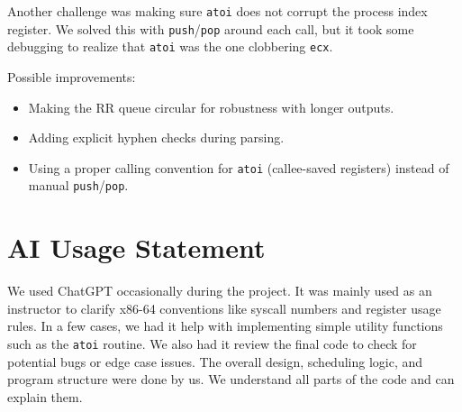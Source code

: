 \documentclass[a4paper,12pt]{article}
\begin{document}
Another challenge was making sure \texttt{atoi} does not corrupt the process index register. We solved this with \texttt{push}/\texttt{pop} around each call, but it took some debugging to realize that \texttt{atoi} was the one clobbering \texttt{ecx}.

Possible improvements:
\begin{itemize}
    \item Making the RR queue circular for robustness with longer outputs.
    \item Adding explicit hyphen checks during parsing.
    \item Using a proper calling convention for \texttt{atoi} (callee-saved registers) instead of manual \texttt{push}/\texttt{pop}.
\end{itemize}

\section*{AI Usage Statement}

We used ChatGPT occasionally during the project. It was mainly used as an instructor to clarify x86-64 conventions like syscall numbers and register usage rules. In a few cases, we had it help with implementing simple utility functions such as the \texttt{atoi} routine. We also had it review the final code to check for potential bugs or edge case issues. The overall design, scheduling logic, and program structure were done by us. We understand all parts of the code and can explain them.
\end{document}
